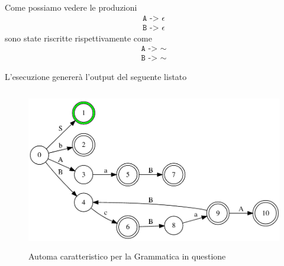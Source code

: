 \documentclass[12pt]{article}
\begin{document}
Come possiamo vedere le produzioni 
\begin{align*}
\texttt{A -> $\epsilon$} \\
\texttt{B -> $\epsilon$}
\end{align*}
sono state riscritte rispettivamente come 
\begin{align*}
\texttt{A -> $\sim$} \\
\texttt{B -> $\sim$}
\end{align*}

L'esecuzione genererà l'output del seguente listato

\begin{figure}[h]
  \includegraphics[height=7cm, keepaspectratio]{assets/automa6.png}
  \caption{Automa caratteristico per la Grammatica in questione}
  \label{fig:automa1}
\end{figure}
\end{document}
